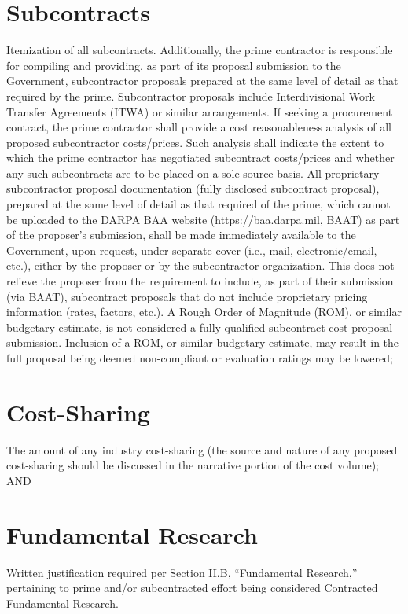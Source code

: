 \section{Subcontracts}
Itemization of all subcontracts. Additionally, the prime contractor is responsible for
compiling and providing, as part of its proposal submission to the Government, subcontractor
proposals prepared at the same level of detail as that required by the prime. Subcontractor
proposals include Interdivisional Work Transfer Agreements (ITWA) or similar
arrangements. If seeking a procurement contract, the prime contractor shall provide a cost
reasonableness analysis of all proposed subcontractor costs/prices. Such analysis shall
indicate the extent to which the prime contractor has negotiated subcontract costs/prices and
whether any such subcontracts are to be placed on a sole-source basis.
All proprietary subcontractor proposal documentation (fully disclosed subcontract proposal),
prepared at the same level of detail as that required of the prime, which cannot be uploaded
to the DARPA BAA website (https://baa.darpa.mil, BAAT) as part of the proposer’s
submission, shall be made immediately available to the Government, upon request, under
separate cover (i.e., mail, electronic/email, etc.), either by the proposer or by the
subcontractor organization. This does not relieve the proposer from the requirement to
include, as part of their submission (via BAAT), subcontract proposals that do not include
proprietary pricing information (rates, factors, etc.).
A Rough Order of Magnitude (ROM), or similar budgetary estimate, is not considered a fully
qualified subcontract cost proposal submission. Inclusion of a ROM, or similar budgetary
estimate, may result in the full proposal being deemed non-compliant or evaluation ratings
may be lowered;
\section{Cost-Sharing}
The amount of any industry cost-sharing (the source and nature of any proposed cost-sharing
should be discussed in the narrative portion of the cost volume); AND
\section{Fundamental Research}
Written justification required per Section II.B, “Fundamental Research,” pertaining to prime
and/or subcontracted effort being considered Contracted Fundamental Research.

